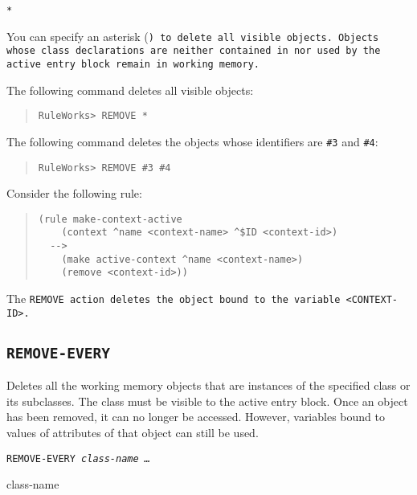 {{\begin{arguments}
\item[\tt{*}]

  You can specify an asterisk (\tt*) to delete all visible
  objects. Objects whose class declarations are neither contained in
  nor used by the active entry block remain in working memory.
\end{arguments}

\Example

The following command deletes all visible objects:

\begin{quote}
\begin{verbatim}
RuleWorks> REMOVE *
\end{verbatim}
\end{quote}

The following command deletes the objects whose identifiers
are \verb|#3| and \verb|#4|:

\begin{quote}
\begin{verbatim}
RuleWorks> REMOVE #3 #4
\end{verbatim}
\end{quote}

Consider the following rule:

\begin{quote}
\begin{verbatim}
(rule make-context-active
    (context ^name <context-name> ^$ID <context-id>)
  -->
    (make active-context ^name <context-name>)
    (remove <context-id>))
\end{verbatim}
\end{quote}

The \tt{REMOVE} action deletes the object bound to the variable
\verb|<CONTEXT-ID>|.

\subsection{\tt{REMOVE-EVERY}}

Deletes all the working memory objects that are instances of the
specified class or its subclasses. The class must be visible to the
active entry block. Once an object has been removed, it can no longer
be accessed. However, variables bound to values of attributes of that
object can still be used.

\Format

\tt{REMOVE-EVERY} \it{class-name} \ldots

\begin{arguments}
\item[class-name]


\end{arguments}}}
